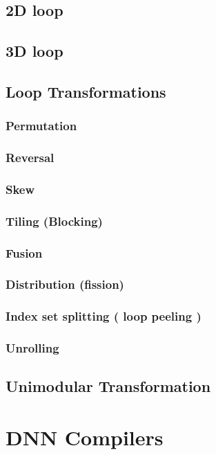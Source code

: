 \documentclass[11pt]{article}
\begin{document}
\subsection{2D loop}
\label{sec:org3b3772c}
\subsection{3D loop}
\label{sec:org2d55dd5}
\subsection{Loop Transformations}
\label{sec:org3a7e081}
\subsubsection{Permutation}
\label{sec:org98bf787}
\subsubsection{Reversal}
\label{sec:org8f35eda}
\subsubsection{Skew}
\label{sec:org77a5548}
\subsubsection{Tiling (Blocking)}
\label{sec:orga4f0e5c}
\subsubsection{Fusion}
\label{sec:org2132637}
\subsubsection{Distribution (fission)}
\label{sec:orge8030e4}
\subsubsection{Index set splitting ( loop peeling )}
\label{sec:orgb9596bc}
\subsubsection{Unrolling}
\label{sec:orge1159a5}
\subsection{Unimodular Transformation}
\label{sec:org206fd85}
\section{DNN Compilers}
\label{sec:org0713e6a}
\end{document}
